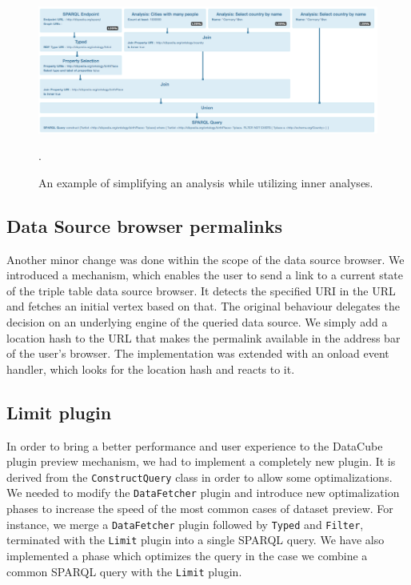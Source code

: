 \begin{figure}
	\centering
	\includegraphics[width=140mm]{img/inner-example-simpler.png}
	\caption{An example of simplifying an analysis while utilizing inner analyses.}.
	\label{fig:inner-example-simpler}
\end{figure}

\subsection{Data Source browser permalinks}
Another minor change was done within the scope of the data source browser.
We introduced a mechanism, which enables the user to send a link to a current 
state of the triple table data source browser. It detects the specified URI in 
the URL and fetches an initial vertex based on that. The original behaviour delegates 
the decision on an underlying engine of the queried data source. We simply add a 
location hash to the URL that makes the permalink available in the address bar 
of the user's browser. The implementation was extended with an onload event 
handler, which looks for the location hash and reacts to it.

\subsection{Limit plugin}
In order to bring a better performance and user experience to the DataCube plugin
preview mechanism, we had to implement a completely new plugin. It is derived 
from the \texttt{ConstructQuery} class in order to allow some optimalizations. 
We needed to modify the \texttt{DataFetcher} plugin and introduce new 
optimalization phases to increase the speed of the most common cases of dataset 
preview. For instance, we merge a \texttt{DataFetcher} plugin followed by 
\texttt{Typed} and \texttt{Filter}, terminated with the \texttt{Limit} plugin 
into a single SPARQL query. We have also implemented a phase which optimizes
the query in the case we combine a common SPARQL query with the \texttt{Limit} plugin.
